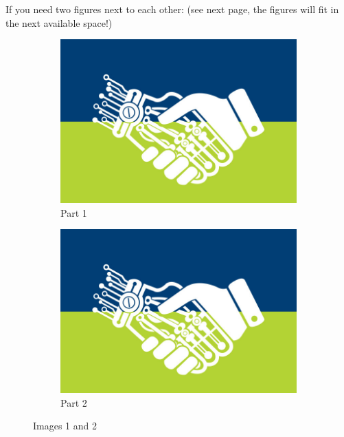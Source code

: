 \noindent If you need two figures next to each other: (see next page, the figures will fit in the next available space!)
\begin{figure}
\begin{multicols}{2}
    \centering
        \begin{subfigure}[b]{0.475\textwidth}
            \centering
            \includegraphics[width=\textwidth]{img/bioeng.jpg}
            \caption{Part 1}    
        \end{subfigure}
        \hfill
        \begin{subfigure}[b]{0.475\textwidth}  
            \centering 
            \includegraphics[width=\textwidth]{img/bioeng.jpg}
            \caption{Part 2}    
        \end{subfigure}
\end{multicols}
    \caption{Images 1 and 2}
    \label{fig:2}
\end{figure}

